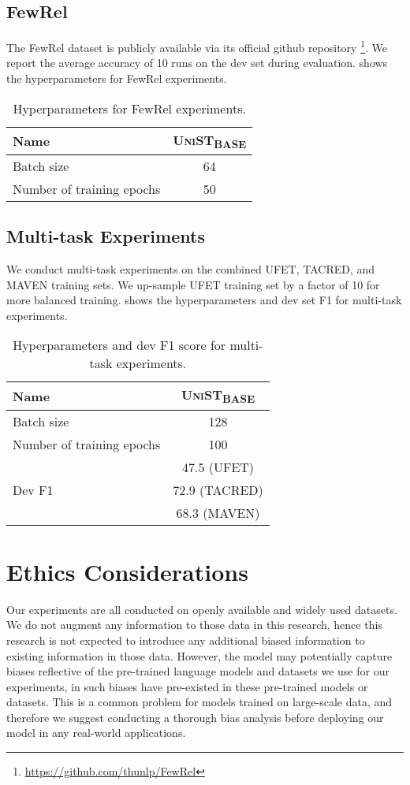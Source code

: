 \documentclass[11pt]{article}
\newcommand{\basemodel}{\textsc{UniST}\textsubscript{BASE}}
\begin{document}
\subsection{FewRel}
The FewRel dataset is publicly available via its official github repository \footnote{\url{https://github.com/thunlp/FewRel}}. We report the average accuracy of 10 runs on the dev set during evaluation.  shows the hyperparameters for FewRel experiments.
\begin{table}[h]
    \centering
    \small
    \begin{tabular}{l|c}
        \toprule
        Name & \basemodel \\
        \midrule
        Batch size & 64 \\
        Number of training epochs & 50 \\
        \bottomrule
    \end{tabular}
    \caption{Hyperparameters for FewRel experiments.} 
    \label{tab:fewrelhyp}
\end{table} 
\subsection{Multi-task Experiments}
We conduct multi-task experiments on the combined UFET, TACRED, and MAVEN training sets. We up-sample UFET training set by a factor of 10 for more balanced training.  shows the hyperparameters and dev set F1 for multi-task experiments.
\begin{table}[h]
    \centering
    \small
    \begin{tabular}{l|c}
        \toprule
        Name & \basemodel \\
        \midrule
        Batch size & 128 \\
        Number of training epochs & 100 \\
        \multirow{3}{*}{Dev F1} & 47.5 (UFET) \\
        & 72.9 (TACRED) \\
        & 68.3 (MAVEN) \\
        \bottomrule
    \end{tabular}
    \caption{Hyperparameters and dev F1 score for multi-task experiments.} 
    \label{tab:multihyp}
\end{table} 
\section{Ethics Considerations}
Our experiments are all conducted on openly available and widely used datasets. We do not augment any information to those data in this research, hence this research is not expected to introduce any additional biased information to existing information in those data. However, the model may potentially capture biases reflective of the pre-trained language models and datasets we use for our experiments, in such biases have pre-existed in these pre-trained models or datasets. This is a common problem for models trained on large-scale data, and therefore we suggest conducting a thorough bias analysis before deploying our model in any real-world applications.

 
\end{document}
